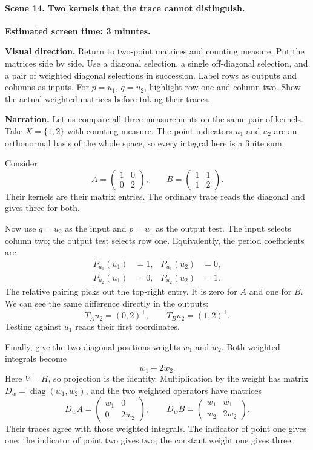 \paragraph{Scene 14. Two kernels that the trace cannot distinguish.}
\textbf{Estimated screen time: 3 minutes.}

\textbf{Visual direction.} Return to two-point matrices and counting measure. Put the matrices side by side. Use a diagonal selection, a single off-diagonal selection, and a pair of weighted diagonal selections in succession. Label rows as outputs and columns as inputs. For $p=u_1$, $q=u_2$, highlight row one and column two. Show the actual weighted matrices before taking their traces.

\textbf{Narration.} Let us compare all three measurements on the same pair of kernels. Take $X=\{1,2\}$ with counting measure. The point indicators $u_1$ and $u_2$ are an orthonormal basis of the whole space, so every integral here is a finite sum.

Consider
\[
A=\begin{pmatrix}1&0\\0&2\end{pmatrix},\qquad
B=\begin{pmatrix}1&1\\1&2\end{pmatrix}.
\]
Their kernels are their matrix entries. The ordinary trace reads the diagonal and gives three for both.

Now use $q=u_2$ as the input and $p=u_1$ as the output test. The input selects column two; the output test selects row one. Equivalently, the period coefficients are
\[
\begin{aligned}
P_{u_1}(u_1)&=1,&P_{u_1}(u_2)&=0,\\
P_{u_2}(u_1)&=0,&P_{u_2}(u_2)&=1.
\end{aligned}
\]
The relative pairing picks out the top-right entry. It is zero for $A$ and one for $B$. We can see the same difference directly in the outputs:
\[
T_Au_2=(0,2)^{\mathsf{T}},\qquad
T_Bu_2=(1,2)^{\mathsf{T}}.
\]
Testing against $u_1$ reads their first coordinates.

Finally, give the two diagonal positions weights $w_1$ and $w_2$. Both weighted integrals become
\[
w_1+2w_2.
\]
Here $V=H$, so projection is the identity. Multiplication by the weight has matrix $D_w=\operatorname{diag}(w_1,w_2)$, and the two weighted operators have matrices
\[
D_wA=\begin{pmatrix}w_1&0\\0&2w_2\end{pmatrix},\qquad
D_wB=\begin{pmatrix}w_1&w_1\\w_2&2w_2\end{pmatrix}.
\]
Their traces agree with those weighted integrals. The indicator of point one gives one; the indicator of point two gives two; the constant weight one gives three.

